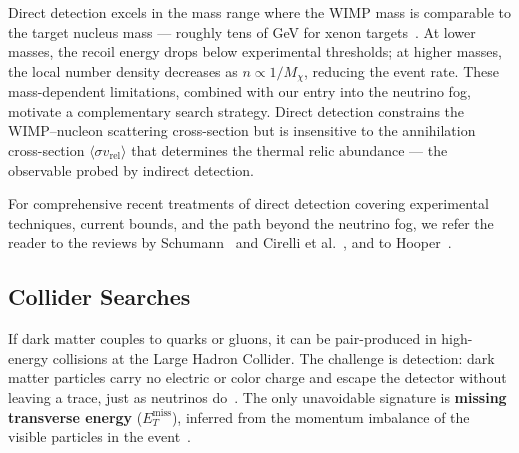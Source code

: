 Direct detection excels in the mass range where the WIMP mass is comparable to the target nucleus mass --- roughly tens of GeV for xenon targets~\cite{Cirelli:2024ssz}.
At lower masses, the recoil energy drops below experimental thresholds; at higher masses, the local number density decreases as $n \propto 1/M_\chi$, reducing the event rate.
These mass-dependent limitations, combined with our entry into the neutrino fog, motivate a complementary search strategy.
Direct detection constrains the WIMP--nucleon scattering cross-section but is insensitive to the annihilation cross-section $\langle \sigma v_\mathrm{rel} \rangle$ that determines the thermal relic abundance --- the observable probed by indirect detection.

For comprehensive recent treatments of direct detection covering experimental techniques, current bounds, and the path beyond the neutrino fog, we refer the reader to the reviews by Schumann~\cite{Schumann:2019eaa} and Cirelli et al.~\cite{Cirelli:2024ssz}, and to Hooper~\cite{Hooper:2024}.

\subsection{Collider Searches}
\label{sec:1.3.2}

If dark matter couples to quarks or gluons, it can be pair-produced in high-energy collisions at the Large Hadron Collider.
The challenge is detection: dark matter particles carry no electric or color charge and escape the detector without leaving a trace, just as neutrinos do~\cite{Cirelli:2024ssz,Hooper:2024}.
The only unavoidable signature is \textbf{missing transverse energy} ($E_T^\text{miss}$), inferred from the momentum imbalance of the visible particles in the event~\cite{Cirelli:2024ssz}.

